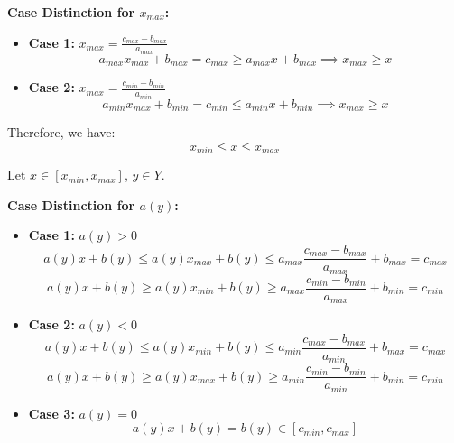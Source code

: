 \textbf{Case Distinction for \( x_{max} \):}

\begin{itemize}
	\item \textbf{Case 1:} \( x_{max} = \frac{c_{max} - b_{max}}{a_{max}} \)
	      \begin{equation}
		      a_{max} x_{max} + b_{max} = c_{max} \geq a_{max} x + b_{max} \implies x_{max} \geq x
	      \end{equation}

	\item \textbf{Case 2:} \( x_{max} = \frac{c_{min} - b_{min}}{a_{min}} \)
	      \begin{equation}
		      a_{min} x_{max} + b_{min} = c_{min} \leq a_{min} x + b_{min} \implies x_{max} \geq x
	      \end{equation}
\end{itemize}

Therefore, we have:
\begin{equation}
	x_{min} \leq x \leq x_{max}
\end{equation}

Let \( x \in [x_{min}, x_{max}] \), \( y \in Y \).

\textbf{Case Distinction for \( a(y) \):}

\begin{itemize}
	\item \textbf{Case 1:} \( a(y) > 0 \)
	      \begin{equation}
		      a(y) x + b(y) \leq a(y) x_{max} + b(y) \leq a_{max} \frac{c_{max} - b_{max}}{a_{max}} + b_{max} = c_{max}
	      \end{equation}
	      \begin{equation}
		      a(y) x + b(y) \geq a(y) x_{min} + b(y) \geq a_{max} \frac{c_{min} - b_{min}}{a_{max}} + b_{min} = c_{min}
	      \end{equation}

	\item \textbf{Case 2:} \( a(y) < 0 \)
	      \begin{equation}
		      a(y) x + b(y) \leq a(y) x_{min} + b(y) \leq a_{min} \frac{c_{max} - b_{max}}{a_{min}} + b_{max} = c_{max}
	      \end{equation}
	      \begin{equation}
		      a(y) x + b(y) \geq a(y) x_{max} + b(y) \geq a_{min} \frac{c_{min} - b_{min}}{a_{min}} + b_{min} = c_{min}
	      \end{equation}

	\item \textbf{Case 3:} \( a(y) = 0 \)
	      \begin{equation}
		      a(y) x + b(y) = b(y) \in [c_{min}, c_{max}]
	      \end{equation}
\end{itemize}

